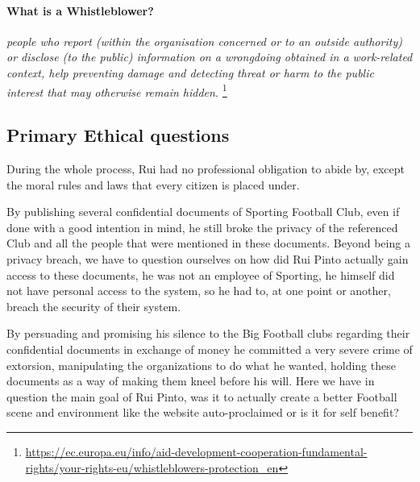 \paragraph{What is a Whistleblower?}
\textit{people who report (within the organisation concerned or to an outside authority) or disclose (to the public) information on a wrongdoing obtained in a work-related context, help preventing damage and detecting threat or harm to the public interest that may otherwise remain hidden.}
\footnote{\url{https://ec.europa.eu/info/aid-development-cooperation-fundamental-rights/your-rights-eu/whistleblowers-protection_en}}




\subsection{Primary Ethical questions}
During the whole process, Rui had no professional obligation to abide by, except the moral rules and laws that every citizen is placed under.

By publishing several confidential documents of Sporting Football Club, even if done with a good intention in mind, he still broke the privacy of the referenced Club and all the people that were mentioned in these documents.
Beyond being a privacy breach, we have to question ourselves on how did Rui Pinto actually gain access to these documents, he was not an employee of Sporting, he himself did not have personal access to the system, so he had to, at one point or another, breach the security of their system.

By persuading and promising his silence to the Big Football clubs regarding their confidential documents in exchange of money he committed a very severe crime of extorsion, manipulating the organizations to do what he wanted, holding these documents as a way of making them kneel before his will.
Here we have in question the main goal of Rui Pinto, was it to actually create a better Football scene and environment like the website auto-proclaimed or is it for self benefit?


